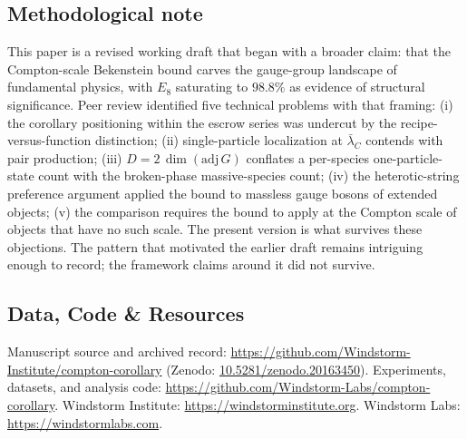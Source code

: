 \documentclass[11pt]{article}
\newcommand{\lbar}{\bar\lambda_{C}}
\begin{document}
\subsection*{Methodological note}
This paper is a revised working draft that began with a broader claim: that the Compton-scale
Bekenstein bound carves the gauge-group landscape of fundamental physics, with $E_{8}$ saturating to
$98.8\%$ as evidence of structural significance. Peer review identified five technical problems with
that framing: (i) the corollary positioning within the escrow series was undercut by the
recipe-versus-function distinction; (ii) single-particle localization at $\lbar$ contends with pair
production; (iii) $D = 2\,\dim(\mathrm{adj}\,G)$ conflates a per-species one-particle-state count with
the broken-phase massive-species count; (iv) the heterotic-string preference argument applied the
bound to massless gauge bosons of extended objects; (v) the comparison requires the bound to apply at
the Compton scale of objects that have no such scale. The present version is what survives these
objections. The pattern that motivated the earlier draft remains intriguing enough to record; the
framework claims around it did not survive.

\subsection*{Data, Code \& Resources}
\noindent Manuscript source and archived record: \url{https://github.com/Windstorm-Institute/compton-corollary} (Zenodo: \href{https://doi.org/10.5281/zenodo.20163450}{10.5281/zenodo.20163450}). Experiments, datasets, and analysis code: \url{https://github.com/Windstorm-Labs/compton-corollary}. Windstorm Institute: \url{https://windstorminstitute.org}. Windstorm Labs: \url{https://windstormlabs.com}.
\end{document}
